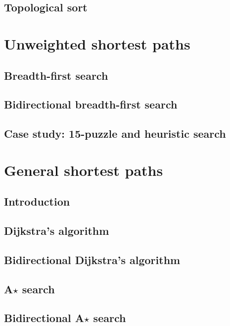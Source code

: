 \documentclass[oneside]{book}
\begin{document}
\section{Topological sort}

\chapter{Unweighted shortest paths}

\section{Breadth-first search}

\section{Bidirectional breadth-first search}

\section{Case study: 15-puzzle and heuristic search}

\chapter{General shortest paths} 

\section{Introduction}

\section{Dijkstra's algorithm}

\section{Bidirectional Dijkstra's algorithm}

\section{A$\star$ search}

\section{Bidirectional A$\star$ search}
\end{document}
